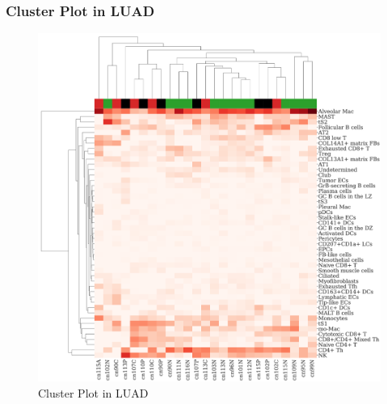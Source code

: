 \documentclass{beamer}
\begin{document}
    \begin{frame}
        \frametitle{Cluster Plot in LUAD}

        \begin{figure}
            \includegraphics[height=0.6 \textheight]{figures/BisqueRNA/clustermap/STAR.ADC.GSE131907.cluster.pdf}
            \caption{Cluster Plot in LUAD}
        \end{figure}
    \end{frame}
\end{document}
